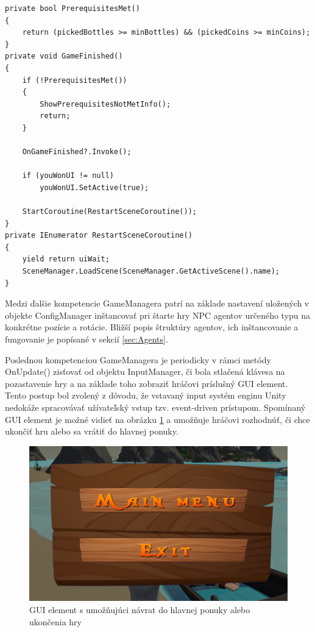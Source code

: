 \documentclass[slovak, master]{diploma}
\begin{document}
\vspace{8pt}
\begin{lstlisting}[label=src:FinishGame,caption={Ukončenie hry v prípade výhry hráča}]
private bool PrerequisitesMet()
{
    return (pickedBottles >= minBottles) && (pickedCoins >= minCoins);
}
private void GameFinished()
{
    if (!PrerequisitesMet())
    {
        ShowPrerequisitesNotMetInfo();
        return;
    }

    OnGameFinished?.Invoke();

    if (youWonUI != null)
        youWonUI.SetActive(true);

    StartCoroutine(RestartSceneCoroutine());
}
private IEnumerator RestartSceneCoroutine()
{
    yield return uiWait;
    SceneManager.LoadScene(SceneManager.GetActiveScene().name);
}
\end{lstlisting}

Medzi ďalšie kompetencie GameManagera patrí na základe nastavení uložených v objekte ConfigManager inštancovať pri štarte hry NPC agentov určeného typu na konkrétne pozície a rotácie. Bližší popis štruktúry agentov, ich inštancovanie a fungovanie je popísané v sekcií \ref{sec:Agents}.

Poslednou kompetenciou GameManagera je periodicky v rámci metódy OnUpdate() zisťovať od objektu InputManager, či bola stlačená klávesa na pozastavenie hry a na základe toho zobraziť hráčovi príslušný GUI element. Tento postup bol zvolený z dôvodu, že vstavaný input systém enginu Unity nedokáže spracovávať užívateľský vstup tzv. event-driven prístupom. Spomínaný GUI element je možné vidieť na obrázku \ref{pic:PauseUI} a umožňuje hráčovi rozhodnúť, či chce ukončiť hru alebo sa vrátiť do hlavnej ponuky. 

\begin{figure}[!htbp]
    \centering
    \includegraphics[width=.65\textwidth]{Figures/pauseUI.png}
    \caption{GUI element s umožňujúci návrat do hlavnej ponuky alebo ukončenia hry}
    \label{pic:PauseUI}
\end{figure}
\end{document}
